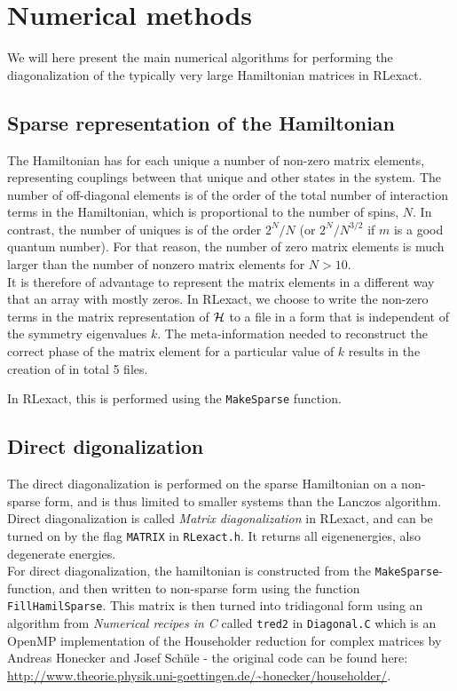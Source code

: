 \documentclass{article}
\begin{document}
\section{Numerical methods}
We will here present the main numerical algorithms for performing the diagonalization of the typically very large Hamiltonian matrices in RLexact.

\subsection{Sparse representation of the Hamiltonian}
The Hamiltonian has for each unique a number of non-zero matrix elements, representing couplings between that unique and other states in the system. The number of off-diagonal elements is of the order of the total number of interaction terms in the Hamiltonian, which is proportional to the number of spins, $N$. In contrast, the number of uniques is of the order $2^N/N$ (or $2^N/N^{3/2}$ if $m$ is a good quantum number). For that reason, the number of zero matrix elements is much larger than the number of nonzero matrix elements for $N > 10$. \\

It is therefore of advantage to represent the matrix elements in a different way that an array with mostly zeros. In RLexact, we choose to write the non-zero terms in the matrix representation of ${\cal H}$ to a file in a form that is independent of the symmetry eigenvalues $k$. The meta-information needed to reconstruct the correct phase of the matrix element for a particular value of $k$ results in the creation of in total 5 files.

In RLexact, this is performed using the \texttt{MakeSparse} function. 

\subsection{Direct digonalization}
The direct diagonalization is performed on the sparse Hamiltonian on a non-sparse form, and is thus limited to smaller systems than the Lanczos algorithm. Direct diagonalization is called \textit{Matrix diagonalization} in RLexact, and can be turned on by the flag \texttt{MATRIX} in \texttt{RLexact.h}. It returns all eigenenergies, also degenerate energies.\\

For direct diagonalization, the hamiltonian is constructed from the \texttt{MakeSparse}-function, and then written to non-sparse form using the function \texttt{FillHamilSparse}. This matrix is then turned into tridiagonal form using an algorithm from \textit{Numerical recipes in C} called \texttt{tred2} in \texttt{Diagonal.C} which is an OpenMP implementation of the Householder reduction for complex matrices by Andreas Honecker and Josef Schüle - the original code can be found here: \url{http://www.theorie.physik.uni-goettingen.de/~honecker/householder/}.\\
\end{document}
